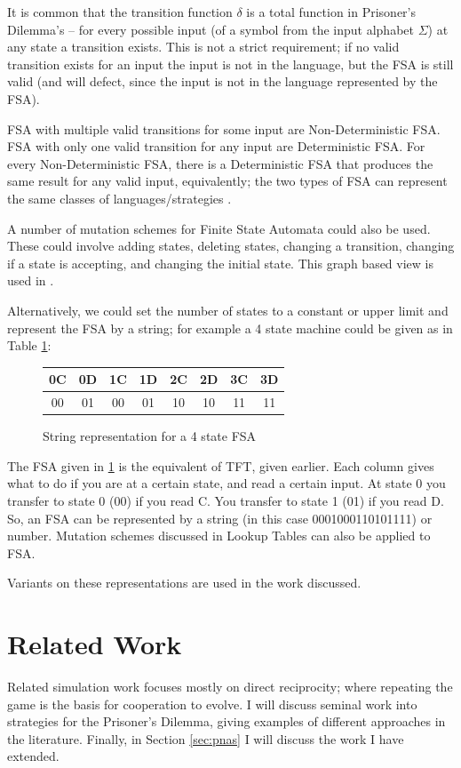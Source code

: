 \documentclass[a4paper,11pt,bcshonoursthesis,singlespace,oneside,thesisdraft,pdflatex]{cssethesis}
\begin{document}
It is common that the transition function $\delta$ is a total function in Prisoner's Dilemma's -- for every possible input (of a symbol from the input alphabet $\Sigma$) at any state a transition exists. 
This is not a strict requirement; if no valid transition exists for an input the input is not in the language, but the FSA is still valid (and will defect, since the input is not in the language represented by the FSA). 

FSA with multiple valid transitions for some input are Non-Deterministic FSA. 
FSA with only one valid transition for any input are Deterministic FSA. 
For every Non-Deterministic FSA, there is a Deterministic FSA that produces the same result for any valid input, equivalently; the two types of FSA can represent the same classes of languages/strategies \citep[][pp 35 -- 63]{Sipser2006}. 

A number of mutation schemes for Finite State Automata could also be used. 
These could involve adding states, deleting states, changing a transition, changing if a state is accepting, and changing the initial state. 
This graph based view is used in \citet{van-veelen:PNAS:2012}. 

Alternatively, we could set the number of states to a constant or upper limit and represent the FSA by a string; for example a 4 state machine could be given as in Table \ref{table:fsa4state}:
\begin{figure}[h]
\center
\begin{tabular}{|c|c|c|c|c|c|c|c|}
\hline
0C & 0D & 1C&1D&2C&2D&3C&3D\\
\hline
00 & 01 & 00&01&10&10&11&11\\
\hline
\end{tabular}\hfill
\caption{String representation for a 4 state FSA}
\label{table:fsa4state}
\end{figure}

The FSA given in \ref{table:fsa4state} is the equivalent of TFT, given earlier. 
Each column gives what to do if you are at a certain state, and read a certain input. 
At state 0 you transfer to state 0 (00) if you read C. 
You transfer to state 1 (01) if you read D. 
So, an FSA can be represented by a string (in this case 0001000110101111) or number. 
Mutation schemes discussed in Lookup Tables can also be applied to FSA. 

Variants on these representations are used in the work discussed.
\section{Related Work}
\label{sec:relatedWork}
Related simulation work focuses mostly on direct reciprocity; where repeating the game is the basis for cooperation to evolve. 
I will discuss seminal work into strategies for the Prisoner's Dilemma, giving examples of different approaches in the literature. Finally, in Section \ref{sec:pnas} I will discuss the work I have extended.
\end{document}
